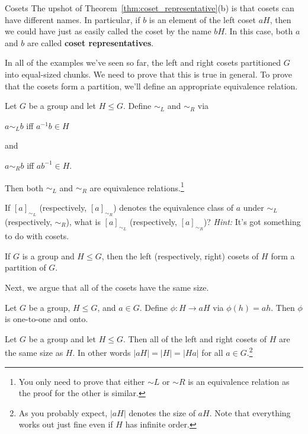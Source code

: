\begin{section}{Cosets}
The upshot of Theorem~\ref{thm:coset_representative}(b) is that cosets can have different names.  In particular, if \(b\) is an element of the left coset \(aH\), then we could have just as easily called the coset by the name \(bH\).  In this case, both \(a\) and \(b\) are called \textbf{coset representatives}.

In all of the examples we've seen so far, the left and right cosets partitioned \(G\) into equal-sized chunks.  We need to prove that this is true in general.  To prove that the cosets form a partition, we'll define an appropriate equivalence relation.

\begin{theorem}
Let \(G\) be a group and let \(H\leq G\).  Define \(\sim_L\) and \(\sim_R\) via 
\begin{center}
\(a\sim_L b\) iff \(a^{-1}b\in H\)
\end{center}
and
\begin{center}
\(a\sim_R b\) iff \(ab^{-1}\in H\).
\end{center}
Then both \(\sim_L\) and \(\sim_R\) are equivalence relations.\footnote{You only need to prove that either \(\sim L\) or \(\sim R\) is an equivalence relation as the proof for the other is similar.}
\end{theorem}

\begin{problem}
If \([a]_{\sim_L}\) (respectively, \([a]_{\sim_R}\)) denotes the equivalence class of \(a\) under \(\sim_L\) (respectively, \(\sim_R\)), what is \([a]_{\sim_L}\) (respectively, \([a]_{\sim_R}\))?  \emph{Hint:} It's got something to do with cosets.
\end{problem}

\begin{corollary}
If \(G\) is a group and \(H\leq G\), then the left (respectively, right) cosets of \(H\) form a partition of \(G\).
\end{corollary}

Next, we argue that all of the cosets have the same size.

\begin{theorem}
Let \(G\) be a group, \(H\leq G\), and \(a\in G\).  Define \(\phi:H\to aH\) via \(\phi(h)=ah\).  Then \(\phi\) is one-to-one and onto.
\end{theorem}

\begin{corollary}\label{cor:cosets_same_size}
Let \(G\) be a group and let \(H\leq G\).  Then all of the left and right cosets of \(H\) are the same size as \(H\).  In other words \(|aH|=|H|=|Ha|\) for all \(a\in G\).\footnote{As you probably expect, \(|aH|\) denotes the size of \(aH\). Note that everything works out just fine even if \(H\) has infinite order.}
\end{corollary}

\end{section}

